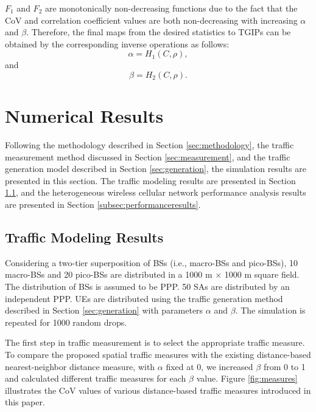 \documentclass[journal]{IEEEtran}
\begin{document}
$F_{1}$ and $F_{2}$ are monotonically non-decreasing functions due to the fact that the CoV and correlation coefficient values are both non-decreasing with increasing $\alpha$ and $\beta$. Therefore, the final maps from the desired statistics to TGIPs can be obtained by the corresponding inverse operations as follows:
\begin{equation}
\alpha = H_{1}(C,\rho),
\end{equation}
and
\begin{equation}
\beta = H_{2}(C,\rho).
\end{equation}











\section{Numerical Results}
\label{sec:results}

Following the methodology described in Section \ref{sec:methodology}, the traffic measurement method discussed in Section \ref{sec:measurement}, and the traffic generation model described in Section \ref{sec:generation}, the simulation results are presented in this section. The traffic modeling results are presented in Section \ref{subsec:modelingresults}, and the heterogeneous wireless cellular network performance analysis results are presented in Section \ref{subsec:performanceresults}.

\subsection{Traffic Modeling Results}
\label{subsec:modelingresults}

Considering a two-tier superposition of BSs (i.e., macro-BSs and pico-BSs), 10 macro-BSs and 20 pico-BSs are distributed in a 1000 m $\times$ 1000 m square field. The distribution of BSs is assumed to be PPP. 50 SAs are distributed by an independent PPP. UEs are distributed using the traffic generation method described in Section \ref{sec:generation} with parameters $\alpha$ and $\beta$. The simulation is repeated for 1000 random drops.

The first step in traffic measurement is to select the appropriate traffic measure. To compare the proposed spatial traffic measures with the existing distance-based nearest-neighbor distance measure, with $\alpha$ fixed at 0, we increased $\beta$ from 0 to 1 and calculated different traffic measures for each $\beta$ value. Figure \ref{fig:measures} illustrates the CoV values of various distance-based traffic measures introduced in this paper.
\end{document}
